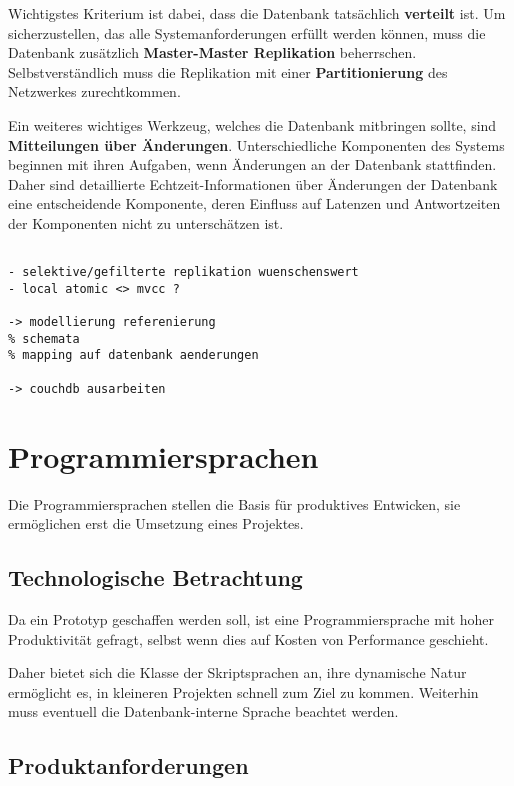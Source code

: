 Wichtigstes Kriterium ist dabei, dass die Datenbank tats\"achlich \textbf{verteilt} ist.
Um sicherzustellen, das alle Systemanforderungen erf\"ullt werden k\"onnen,
muss die Datenbank zus\"atzlich \textbf{Master-Master Replikation} beherrschen.
Selbstverst\"andlich muss die Replikation mit einer \textbf{Partitionierung} des Netzwerkes zurechtkommen.

Ein weiteres wichtiges Werkzeug, welches die Datenbank mitbringen sollte, sind \textbf{Mitteilungen über Änderungen}.
Unterschiedliche Komponenten des Systems beginnen mit ihren Aufgaben,
wenn Änderungen an der Datenbank stattfinden.
Daher sind detaillierte Echtzeit-Informationen über Änderungen der Datenbank eine entscheidende Komponente,
deren Einfluss auf Latenzen und Antwortzeiten der Komponenten nicht zu unterschätzen ist.


\begin{verbatim}

- selektive/gefilterte replikation wuenschenswert
- local atomic <> mvcc ?

-> modellierung referenierung
% schemata
% mapping auf datenbank aenderungen

-> couchdb ausarbeiten

\end{verbatim}


\section{Programmiersprachen}

Die Programmiersprachen stellen die Basis f\"ur produktives Entwicken,
sie erm\"oglichen erst die Umsetzung eines Projektes.

\subsection{Technologische Betrachtung}

Da ein Prototyp geschaffen werden soll,
ist eine Programmiersprache mit hoher Produktivit\"at gefragt,
selbst wenn dies auf Kosten von Performance geschieht.

Daher bietet sich die Klasse der Skriptsprachen an,
ihre dynamische Natur ermöglicht es,
in kleineren Projekten schnell zum Ziel zu kommen.
Weiterhin muss eventuell die Datenbank-interne Sprache beachtet werden.


\subsection{Produktanforderungen}

